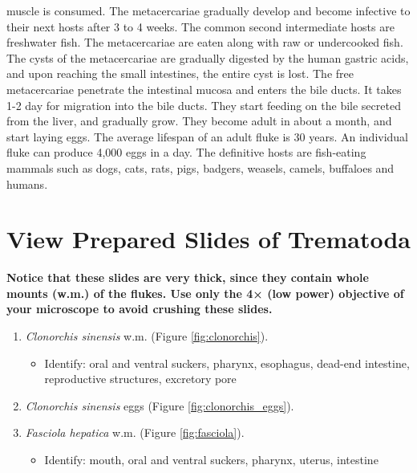 muscle is consumed. The metacercariae gradually develop and become
infective to their next hosts after 3 to 4 weeks. The common second
intermediate hosts are freshwater fish. The metacercariae are eaten
along with raw or undercooked fish. The cysts of the metacercariae are
gradually digested by the human gastric acids, and upon reaching the
small intestines, the entire cyst is lost. The free metacercariae
penetrate the intestinal mucosa and enters the bile ducts. It takes 1-2
day for migration into the bile ducts. They start feeding on the bile
secreted from the liver, and gradually grow. They become adult in about
a month, and start laying eggs. The average lifespan of an adult fluke
is 30 years. An individual fluke can produce 4,000 eggs in a day. The
definitive hosts are fish-eating mammals such as dogs, cats, rats, pigs,
badgers, weasels, camels, buffaloes and humans.

\section{View Prepared Slides of
Trematoda}\label{view-prepared-slides-trematoda}

\textbf{Notice that these slides are very thick, since they contain
whole mounts (w.m.) of the flukes. Use only the 4× (low power) objective
of your microscope to avoid crushing these slides.}

\begin{enumerate}
\def\labelenumi{\arabic{enumi}.}
\tightlist
\item
  \emph{Clonorchis sinensis} w.m. (Figure \ref{fig:clonorchis}).

  \begin{itemize}
  \tightlist
  \item
    Identify: oral and ventral suckers, pharynx, esophagus, dead-end
    intestine, reproductive structures, excretory pore
  \end{itemize}
\item
  \emph{Clonorchis sinensis} eggs (Figure \ref{fig:clonorchis_eggs}).
\item
  \emph{Fasciola hepatica} w.m. (Figure \ref{fig:fasciola}).

  \begin{itemize}
  \tightlist
  \item
    Identify: mouth, oral and ventral suckers, pharynx, uterus,
    intestine
  \end{itemize}
\end{enumerate}

